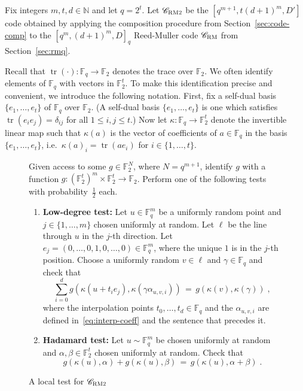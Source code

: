 \documentclass[11pt]{article}
\theoremstyle{definition}
\newcommand{\code}{\mathscr{C}}
\newcommand{\N}{\ensuremath{\mathbb{N}}}
\newcommand{\F}{\ensuremath{\mathbb{F}}}
\newcommand{\RM}{\ensuremath{\textsc{RM}}}
\newcommand{\bRM}{\ensuremath{\textsc{RM2}}}
\DeclareMathOperator{\tr}{tr}
\newenvironment{gamespec}{
  \begin{mdframed}[style=figstyle]}{
  \end{mdframed}}
\begin{document}
Fix integers $m,t,d \in \N$ and let $q=2^t$. Let $\code_{\bRM}$ be the $[q^{m+1},t(d+1)^m,D']$ code obtained by applying the composition procedure from Section~\ref{sec:code-comp} to the $[q^m,(d+1)^m,D]_q$ Reed-Muller code $\code_\RM$ from Section~\ref{sec:rmq}. 

Recall that $\tr(\cdot):\F_q\to\F_2$ denotes the trace over $\F_2$. We often identify elements of $\F_q$ with vectors in $\F_2^t$. To make this identification precise and convenient, we introduce the following notation. First, fix a  self-dual basis $\{e_1,\ldots,e_t\}$  of $\F_q$ over $\F_2$. (A self-dual basis $\{e_1,\ldots,e_t\}$ is one which satisfies $\tr(e_ie_j)=\delta_{ij}$ for all $1\leq i,j\leq t$.)
Now let $\kappa: \F_q \to \F_2^t$ denote the invertible linear map such that $\kappa(a)$ is the vector of coefficients of $a\in \F_q$ in the basis $\{e_1,\ldots,e_t\}$, i.e.\ $\kappa(a)_i=\tr(ae_i)$ for $i\in\{1,\ldots,t\}$. 


\begin{figure}[!htbp]
  \centering
  \begin{gamespec}
Given access to some $g\in \F_2^{N}$, where $N=q^{m+1}$, identify $g$ with a function $g:(\F_2^t)^m \times \F_2^t \to \F_2$. Perform one of the following tests with probability~$\tfrac{1}{2}$ each. 
\begin{enumerate}
	\item \textbf{Low-degree test:}
		Let $u \in \F_q^m$ be a uniformly random point and $j\in \{1,\ldots,m\}$ chosen uniformly at random. Let $\ell$ be the line through $u$ in the $j$-th direction. Let $e_j=(0,\ldots,0,1,0,\ldots,0)\in \F_q^m$, where the unique $1$ is in the $j$-th position. Choose a uniformly random $v\in \ell$ and $\gamma\in \F_q$ and check that 
		\[\sum_{i=0}^d g(\kappa(u+t_i e_j),\kappa(\gamma \alpha_{u,v,i})) \,=\, g(\kappa(v),\kappa(\gamma))\;,\]
		where the interpolation points $t_0,\ldots,t_d \in \F_q$ and the $\alpha_{u,v,i}$ are defined in~\eqref{eq:interp-coeff} and the sentence that precedes it.
	\item \textbf{Hadamard test:} Let $u\sim\F_q^m$ be chosen uniformly at random and $\alpha,\beta\in \F_2^t$ chosen uniformly at random. Check that 
	\[g(\kappa(u),\alpha)+g(\kappa(u),\beta)\,=\,g(\kappa(u),\alpha+\beta)\;.\] 	
    \end{enumerate}
  \end{gamespec}
  \caption{A local test for $\code_{\bRM}$}
  \label{fig:bRM-tester}
\end{figure}
\end{document}
